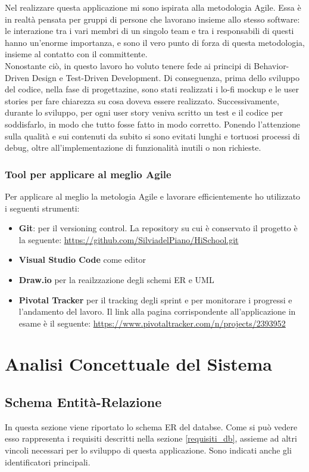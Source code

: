 \documentclass[Lau, binding=0.6cm]{sapthesis}
\begin{document}
Nel realizzare questa applicazione mi sono ispirata alla metodologia Agile. Essa è in realtà pensata per gruppi di persone che lavorano insieme allo stesso software: le interazione tra i vari membri di un singolo team e tra i responsabili di questi hanno un'enorme importanza, e sono il vero punto di forza di questa metodologia, insieme al contatto con il committente.\\
Nonostante ciò, in questo lavoro ho voluto tenere fede ai principi di Behavior-Driven Design e Test-Driven Development. Di conseguenza, prima dello sviluppo del codice, nella fase di progettazine, sono stati realizzati i lo-fi mockup e le user stories per fare chiarezza su cosa doveva essere realizzato. Successivamente, durante lo sviluppo, per ogni user story veniva scritto un test e il codice per soddisfarlo, in modo che tutto fosse fatto in modo corretto. Ponendo l'attenzione sulla qualità e sui contenuti da subito si sono evitati lunghi e tortuosi processi di debug, oltre all'implementazione di funzionalità inutili o non richieste.

\subsection{Tool per applicare al meglio Agile}

Per applicare al meglio la metologia Agile e lavorare efficientemente ho utilizzato i seguenti strumenti:

\begin{itemize}
	\item \textbf{Git}: per il versioning control. La repository su cui è conservato il progetto è la seguente: \url{https://github.com/SilviadelPiano/HiSchool.git}
	\item \textbf{Visual Studio Code} come editor
	\item \textbf{Draw.io} per la reailzzazione degli schemi ER e UML
	\item \textbf{Pivotal Tracker} per il tracking degli sprint e per monitorare i progressi e l'andamento del lavoro. Il link alla pagina corrispondente all'applicazione in esame è il seguente: \url{https://www.pivotaltracker.com/n/projects/2393952}
\end{itemize}

\chapter{Analisi Concettuale del Sistema}

\section{Schema Entità-Relazione}
In questa sezione viene riportato lo schema ER del databse. Come si può vedere esso rappresenta i requisiti descritti nella sezione \ref{requisiti_db}, assieme ad altri vincoli necessari per lo sviluppo di questa applicazione.
Sono indicati anche gli identificatori principali.
\end{document}
